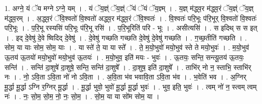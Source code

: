 \documentclass[17pt]{extarticle}
\begin{document}
1. अग्ने॒ यं ॅय मग्ने ऽग्ने॒ यम् । . यं ॅय॒ज्ञ्ं ॅय॒ज्ञ्ं ॅयं ॅयं ॅय॒ज्ञ्म् । . य॒ज्ञ् म॑द्ध्व॒र म॑द्ध्व॒रं ॅय॒ज्ञ्ं ॅय॒ज्ञ् म॑द्ध्व॒रम् । . अ॒द्ध्व॒रं ॅवि॒श्वतो॑ वि॒श्वतो॑ अद्ध्व॒र म॑द्ध्व॒रं ॅवि॒श्वतः॑ । . वि॒श्वतः॑ परि॒भूः प॑रि॒भूर् वि॒श्वतो॑ वि॒श्वतः॑ परि॒भूः । . प॒रि॒भू रस्यसि॑ परि॒भूः प॑रि॒भू रसि॑ । . प॒रि॒भूरिति॑ परि - भूः । . असीत्यसि॑ । . स इदिथ् स स इत् । . इद् दे॒वेषु॑ दे॒वे ष्विदिद् दे॒वेषु॑ । . दे॒वेषु॑ गच्छति गच्छति दे॒वेषु॑ दे॒वेषु॑ गच्छति । . ग॒च्छ॒तीति॑ गच्छति । . सोम॒ या याः सोम॒ सोम॒ याः । . या स्ते॑ ते॒ या या स्ते᳚ । . ते॒ म॒यो॒भुवो॑ मयो॒भुव॑ स्ते ते मयो॒भुवः॑ । . म॒यो॒भुव॑ ऊ॒तय॑ ऊ॒तयो॑ मयो॒भुवो॑ मयो॒भुव॑ ऊ॒तयः॑ । . म॒यो॒भुव॒ इति॑ मयः - भुवः॑ । . ऊ॒तयः॒ सन्ति॒ सन्त्यू॒तय॑ ऊ॒तयः॒ सन्ति॑ । . सन्ति॑ दा॒शुषे॑ दा॒शुषे॒ सन्ति॒ सन्ति॑ दा॒शुषे᳚ । . दा॒शुष॒ इति॑ दा॒शुषे᳚ । . ताभि॑र् नो न॒ स्ताभि॒ स्ताभि॑र् नः । . नो॒ ऽवि॒ता ऽवि॒ता नो॑ नो ऽवि॒ता । . अ॒वि॒ता भ॑व भवावि॒ता ऽवि॒ता भ॑व । . भ॒वेति॑ भव । . अ॒ग्निर् मू॒र्द्धा मू॒र्द्धा ऽग्नि र॒ग्निर् मू॒र्द्धा । . मू॒र्द्धा भुवो॒ भुवो॑ मू॒र्द्धा मू॒र्द्धा भुवः॑ । . भुव॒ इति॒ भुवः॑ । . त्वम् नो॑ न॒ स्त्वम् त्वम् नः॑ । . नः॒ सो॒म॒ सो॒म॒ नो॒ नः॒ सो॒म॒ । . सो॒म॒ या या सो॑म सोम॒ या । \newline
\end{document}
